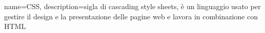 {
	name={CSS},
	description={sigla di cascading style sheets, è un linguaggio usato per gestire il design e la presentazione delle pagine web e lavora in combinazione con HTML}
}